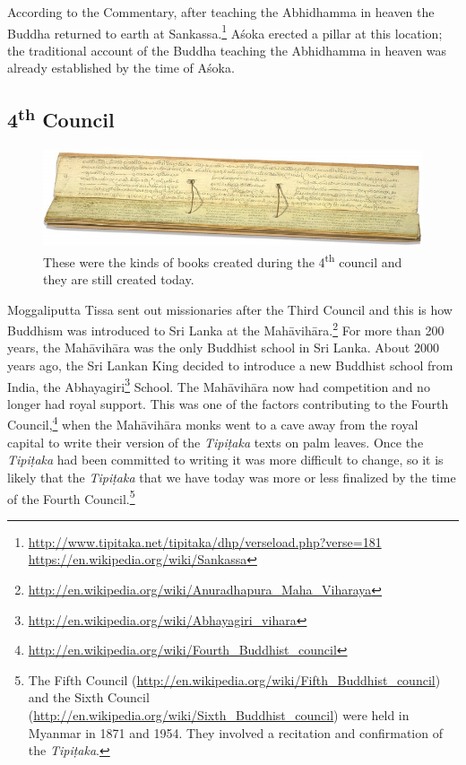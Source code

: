 According to the Commentary, after teaching the Abhidhamma in heaven the Buddha returned to earth at Sankassa.\footnote{\url{http://www.tipitaka.net/tipitaka/dhp/verseload.php?verse=181} \\ \url{https://en.wikipedia.org/wiki/Sankassa}} Aśoka erected a pillar at this location; the traditional account of the Buddha teaching the Abhidhamma in heaven was already established by the time of Aśoka.

\subsection*{4\textsuperscript{th} Council}

\begin{figure}[H]
\centering
\includegraphics[width=0.7\linewidth]{./Diagrams/Palm}
\caption{These were the kinds of books created during the 4\textsuperscript{th} council and they are still created today.}
\label{fig:Palm}
\end{figure}

Moggaliputta Tissa sent out missionaries after the Third Council and this is how Buddhism was introduced to Sri Lanka at the Mahāvihāra.\footnote{\url{http://en.wikipedia.org/wiki/Anuradhapura_Maha_Viharaya}} For more than 200 years, the Mahāvihāra was the only Buddhist school in Sri Lanka. About 2000 years ago, the Sri Lankan King decided to introduce a new Buddhist school from India, the Abhayagiri\footnote{\url{http://en.wikipedia.org/wiki/Abhayagiri_vihara}} School. The Mahāvihāra now had competition and no longer had royal support. This was one of the factors contributing to the Fourth Council,\footnote{\url{http://en.wikipedia.org/wiki/Fourth_Buddhist_council}} when the Mahāvihāra monks went to a cave away from the royal capital to write their version of the \textit{Tipiṭaka} texts on palm leaves. Once the \textit{Tipiṭaka} had been committed to writing it was more difficult to change, so it is likely that the \textit{Tipiṭaka} that we have today was more or less finalized by the time of the Fourth Council.\footnote{The Fifth Council (\url{http://en.wikipedia.org/wiki/Fifth_Buddhist_council}) and the Sixth Council (\url{http://en.wikipedia.org/wiki/Sixth_Buddhist_council}) were held in Myanmar in 1871 and 1954. They involved a recitation and confirmation of the \textit{Tipiṭaka}.}

